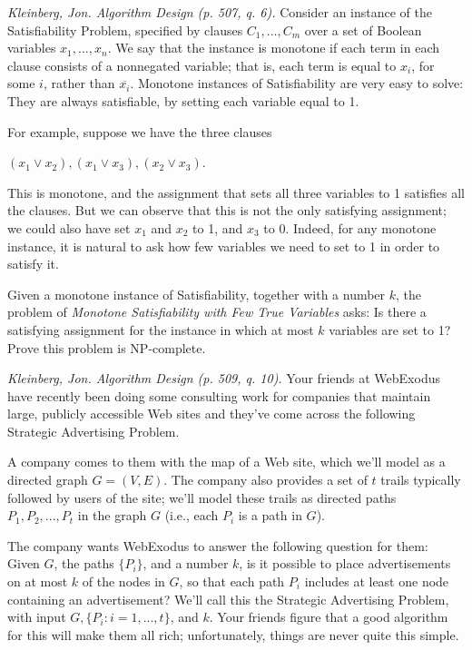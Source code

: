 \documentclass[solutionorbox,answers]{exam}
\begin{document}
\begin{questions}
\newpage


  \question \textit{Kleinberg, Jon. Algorithm Design (p. 507, q. 6).} Consider an instance of the Satisfiability Problem, specified by clauses $C_1,...,C_m$ over a set of Boolean variables $x_1,...,x_n$. We say that the instance is monotone if each term in each clause consists of a nonnegated variable; that is, each term is equal to $x_i$, for some $i$, rather than $\overline{x_i}$. Monotone instances of Satisfiability are very easy to solve: They are always satisfiable, by setting each variable equal to 1.

For example, suppose we have the three clauses
\begin{center}$(x_1\lor x_2),(x_1\lor x_3),(x_2\lor x_3)$.\end{center}

This is monotone, and the assignment that sets all three variables to 1 satisfies all the clauses. But we can observe that this is not the only satisfying assignment; we could also have set $x_1$ and $x_2$ to 1, and $x_3$ to 0. Indeed, for any monotone instance, it is natural to ask how few variables we need to set to 1 in order to satisfy it.

Given a monotone instance of Satisfiability, together with a number $k$, the problem of \textit{Monotone Satisfiability with Few True Variables} asks: Is there a satisfying assignment for the instance in which at most $k$ variables are set to 1? Prove this problem is NP-complete.



  \begin{solutionbox}{} \vspace{1em} 
  \end{solutionbox}

\newpage

\question \textit{Kleinberg, Jon. Algorithm Design (p. 509, q. 10).} Your friends at WebExodus have recently been doing some consulting work for companies that maintain large, publicly accessible Web sites and they’ve come across the following Strategic Advertising Problem.

A company comes to them with the map of a Web site, which we’ll model as a directed graph $G = (V, E)$. The company also provides a set of $t$ trails typically followed by users of the site; we’ll model these trails as directed paths $P_1, P_2,..., P_t$ in the graph $G$ (i.e., each $P_i$ is a path in $G$).

The company wants WebExodus to answer the following question for them: 
Given $G$, the paths $\{P_i\}$, and a number $k$, is it possible to place
advertisements on at most $k$ of the nodes in $G$, so that each path $P_i$
includes at least one node containing an advertisement? We’ll call this
the Strategic Advertising Problem, with input $G, \{P_i : i = 1,...,t\}$, and $k$.
Your friends figure that a good algorithm for this will make them all
rich; unfortunately, things are never quite this simple.


\end{questions}
\end{document}
